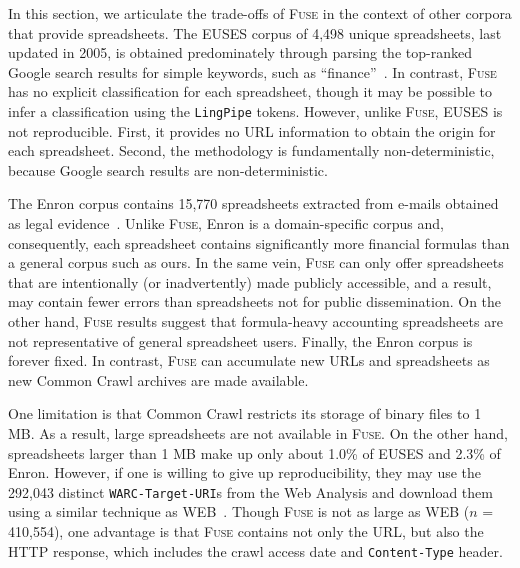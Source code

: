 \documentclass[conference]{IEEEtran}
\newcommand{\urlcountunique}{292,043}
\begin{document}
In this section, we articulate the trade-offs of \textsc{Fuse} in the context of other corpora that provide spreadsheets. The EUSES corpus of 4,498 unique spreadsheets, last updated in 2005, is obtained predominately through parsing the top-ranked Google search results for simple keywords, such as ``finance''~\cite{Fisher2005}. In contrast, \textsc{Fuse} has no explicit classification for each spreadsheet, though it may be possible to infer a classification using the \texttt{LingPipe} tokens. However, unlike \textsc{Fuse}, EUSES is not reproducible. First, it provides no URL information to obtain the origin for each spreadsheet. Second, the methodology is fundamentally non-deterministic, because Google search results are non-deterministic.

The Enron corpus contains 15,770 spreadsheets extracted from e-mails obtained as legal evidence~\cite{Hermans2015}. Unlike \textsc{Fuse}, Enron is a domain-specific corpus and, consequently, each spreadsheet contains significantly more financial formulas than a general corpus such as ours. In the same vein, \textsc{Fuse} can only offer spreadsheets that are intentionally (or inadvertently) made publicly accessible, and a result, may contain fewer errors than spreadsheets not for public dissemination. On the other hand, \textsc{Fuse} results suggest that formula-heavy accounting spreadsheets are not representative of general spreadsheet users. Finally, the Enron corpus is forever fixed. In contrast, \textsc{Fuse} can accumulate new URLs and spreadsheets as new Common Crawl archives are made available.

One limitation is that Common Crawl restricts its storage of binary files to 1 MB. As a result, large spreadsheets are not available in \textsc{Fuse}. On the other hand, spreadsheets larger than 1 MB make up only about 1.0\% of EUSES and 2.3\% of Enron.
%
However, if one is willing to give up reproducibility, they may use the \urlcountunique{} distinct \texttt{WARC-Target-URI}s from the Web Analysis and download them using a similar technique as WEB~\cite{Chen2013}. Though \textsc{Fuse} is not as large as WEB ($n$ = 410,554), one advantage is that \textsc{Fuse} contains not only the URL, but also the HTTP response, which includes the crawl access date and \texttt{Content-Type} header.
\end{document}
